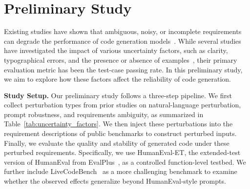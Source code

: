 \section{Preliminary Study}
\label{sec:preStudy}

Existing studies have shown that ambiguous, noisy, or incomplete requirements can degrade the performance of code generation models~\cite{vijayvargiya2026ambigsweinteractiveagentsovercome,10554837,mu2024clarifygpt,jia2025specfix}. While several studies have investigated the impact of various uncertainty factors, such as clarity, typographical errors, and the presence or absence of examples~\cite{10.1145/3697010,liu2024trustworthyllmssurveyguideline,DBLP:journals/corr/abs-2406-10101,xia-etal-2025-survey}, their primary evaluation metric has been the test-case passing rate. In this preliminary study, we aim to explore how these factors affect the reliability of code generation.

\noindent\textbf{Study Setup.} Our preliminary study follows a three-step pipeline. We first collect perturbation types from prior studies on natural-language perturbation, prompt robustness, and requirements ambiguity, as summarized in Table~\ref{tab:uncertainty_factors}. We then inject these perturbations into the requirement descriptions of public benchmarks to construct perturbed inputs. Finally, we evaluate the quality and stability of generated code under these perturbed requirements. Specifically, we use HumanEval-ET, the extended-test version of HumanEval from EvalPlus~\cite{humaneval,liu2023evalplus}, as a controlled function-level testbed. We further include LiveCodeBench~\cite{jain2025livecodebench} as a more challenging benchmark to examine whether the observed effects generalize beyond HumanEval-style prompts.

